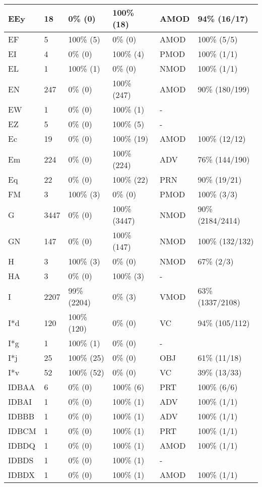 \begin{figure*}
\begin{tabular}{|l|l|l|l||l|l|}
\hline
 EEy & 18 & 0\% (0) & 100\% (18) & AMOD & 94\% (16/17) \\ 
\hline
 EF & 5 & 100\% (5) & 0\% (0) & AMOD & 100\% (5/5) \\ 
\hline
 EI & 4 & 0\% (0) & 100\% (4) & PMOD & 100\% (1/1) \\ 
\hline
 EL & 1 & 100\% (1) & 0\% (0) & NMOD & 100\% (1/1) \\ 
\hline
 EN & 247 & 0\% (0) & 100\% (247) & AMOD & 90\% (180/199) \\ 
\hline
 EW & 1 & 0\% (0) & 100\% (1) & - &  \\ 
\hline
 EZ & 5 & 0\% (0) & 100\% (5) & - &  \\ 
\hline
 Ec & 19 & 0\% (0) & 100\% (19) & AMOD & 100\% (12/12) \\ 
\hline
 Em & 224 & 0\% (0) & 100\% (224) & ADV & 76\% (144/190) \\ 
\hline
 Eq & 22 & 0\% (0) & 100\% (22) & PRN & 90\% (19/21) \\ 
\hline
 FM & 3 & 100\% (3) & 0\% (0) & PMOD & 100\% (3/3) \\ 
\hline
 G & 3447 & 0\% (0) & 100\% (3447) & NMOD & 90\% (2184/2414) \\ 
\hline
 GN & 147 & 0\% (0) & 100\% (147) & NMOD & 100\% (132/132) \\ 
\hline
 H & 3 & 100\% (3) & 0\% (0) & NMOD & 67\% (2/3) \\ 
\hline
 HA & 3 & 0\% (0) & 100\% (3) & - &  \\ 
\hline
 I & 2207 & 99\% (2204) & 0\% (3) & VMOD & 63\% (1337/2108) \\ 
\hline
 I*d & 120 & 100\% (120) & 0\% (0) & VC & 94\% (105/112) \\ 
\hline
 I*g & 1 & 100\% (1) & 0\% (0) & - &  \\ 
\hline
 I*j & 25 & 100\% (25) & 0\% (0) & OBJ & 61\% (11/18) \\ 
\hline
 I*v & 52 & 100\% (52) & 0\% (0) & VC & 39\% (13/33) \\ 
\hline
 IDBAA & 6 & 0\% (0) & 100\% (6) & PRT & 100\% (6/6) \\ 
\hline
 IDBAI & 1 & 0\% (0) & 100\% (1) & ADV & 100\% (1/1) \\ 
\hline
 IDBBB & 1 & 0\% (0) & 100\% (1) & ADV & 100\% (1/1) \\ 
\hline
 IDBCM & 1 & 0\% (0) & 100\% (1) & PRT & 100\% (1/1) \\ 
\hline
 IDBDQ & 1 & 0\% (0) & 100\% (1) & AMOD & 100\% (1/1) \\ 
\hline
 IDBDS & 1 & 0\% (0) & 100\% (1) & - &  \\ 
\hline
 IDBDX & 1 & 0\% (0) & 100\% (1) & AMOD & 100\% (1/1) \\ 
\hline
\end{tabular}
\end{figure*}
